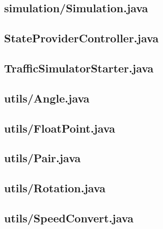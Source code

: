 \subsection{simulation/Simulation.java}

\newpage
\subsection{StateProviderController.java}

\newpage
\subsection{TrafficSimulatorStarter.java}

\newpage
\subsection{utils/Angle.java}

\newpage
\subsection{utils/FloatPoint.java}

\newpage
\subsection{utils/Pair.java}

\newpage
\subsection{utils/Rotation.java}

\newpage
\subsection{utils/SpeedConvert.java}

